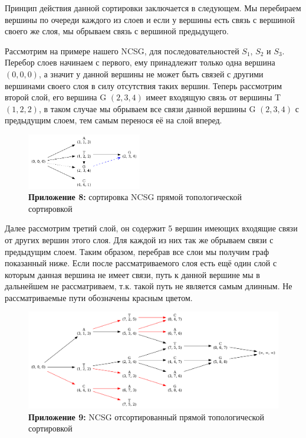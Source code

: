 \documentclass[a4paper,12pt]{extarticle}
\begin{document}
Принцип действия данной сортировки заключается в следующем. Мы перебираем вершины по очереди каждого из слоев и если у вершины есть связь с вершиной своего же слоя, мы обрываем связь с вершиной предыдущего.

Рассмотрим на примере нашего NCSG, для последовательностей $S_{1}$, $S_{2}$ и $S_{3}$. Перебор слоев начинаем с первого, ему принадлежит только одна вершина $(0, 0, 0)$, а значит у данной вершины не может быть связей с другими вершинами своего слоя в силу отсутствия таких вершин. Теперь рассмотрим второй слой, его вершина G $(2, 3, 4)$ имеет входящую связь от вершины T $(1, 2, 2)$, в таком случае мы обрываем все связи данной вершины G $(2, 3, 4)$ с предыдущим слоем, тем самым перенося её на слой вперед.

\begin{figure}
  \captionsetup{justification=centering}
  \caption*{\textbf{Приложение 8:} сортировка NCSG прямой топологической сортировкой}
  \includegraphics[width=0.445\textwidth]{Graph_6.png}
\end{figure}

Далее рассмотрим третий слой, он содержит 5 вершин имеющих входящие связи от других вершин этого слоя. Для каждой из них так же обрываем связи с предыдущим слоем. Таким образом, перебрав все слои мы получим граф показанный ниже. Если после рассматриваемого слоя есть ещё один слой с которым данная вершина не имеет связи, путь к данной вершине мы в дальнейшем не рассматриваем, т.к. такой путь не является самым длинным. Не рассматриваемые пути обозначены красным цветом.
\begin{figure}[h!]
  \centering
  \caption*{\textbf{Приложение 9:} NCSG отсортированный прямой топологической сортировкой}
  \label{ncsg:4}
  \includegraphics[width=1\textwidth]{Graph_2.png}
\end{figure}
\end{document}
